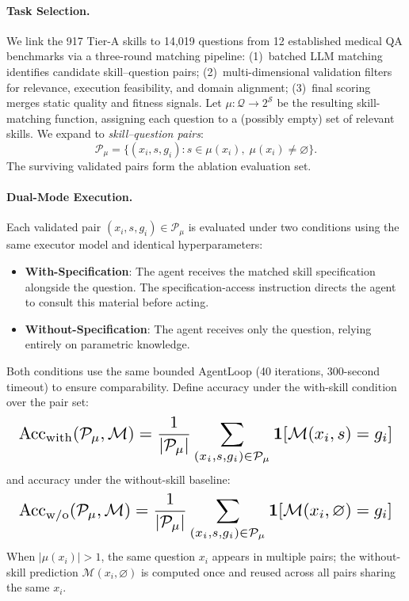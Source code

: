 \paragraph{Task Selection.}
We link the 917 Tier-A skills to 14,019 questions from 12 established medical QA benchmarks via a three-round matching pipeline:
(1)~batched LLM matching identifies candidate skill--question pairs;
(2)~multi-dimensional validation filters for relevance, execution feasibility, and domain alignment;
(3)~final scoring merges static quality and fitness signals.
Let $\mu: \mathcal{Q} \to 2^{\mathcal{S}}$ be the resulting skill-matching function, assigning each question to a (possibly empty) set of relevant skills.
We expand to \emph{skill--question pairs}:
\[
    \mathcal{P}_\mu = \{(x_i, s, g_i) : s \in \mu(x_i),\; \mu(x_i) \neq \varnothing\}.
\]
The surviving validated pairs form the ablation evaluation set.

\paragraph{Dual-Mode Execution.}
Each validated pair $(x_i, s, g_i) \in \mathcal{P}_\mu$ is evaluated under two conditions using the same executor model and identical hyperparameters:
\begin{itemize}[nosep,leftmargin=*]
  \item \textbf{With-Specification}: The agent receives the matched skill specification alongside the question. The specification-access instruction directs the agent to consult this material before acting.
  \item \textbf{Without-Specification}: The agent receives only the question, relying entirely on parametric knowledge.
\end{itemize}
Both conditions use the same bounded AgentLoop (40 iterations, 300-second timeout) to ensure comparability.
Define accuracy under the with-skill condition over the pair set:
\begin{equation}
    \resizebox{0.98\columnwidth}{!}{$\displaystyle
        \text{Acc}_{\text{with}}(\mathcal{P}_\mu, \mathcal{M})
        = \frac{1}{|\mathcal{P}_\mu|}
        \sum_{(x_i, s, g_i) \in \mathcal{P}_\mu}
        \mathbf{1}\!\left[\mathcal{M}(x_i, s) = g_i\right]
    $}
    \label{eq:acc_with}
\end{equation}
and accuracy under the without-skill baseline:
\begin{equation}
    \resizebox{0.98\columnwidth}{!}{$\displaystyle
        \text{Acc}_{\text{w/o}}(\mathcal{P}_\mu, \mathcal{M})
        = \frac{1}{|\mathcal{P}_\mu|}
        \sum_{(x_i, s, g_i) \in \mathcal{P}_\mu}
        \mathbf{1}\!\left[\mathcal{M}(x_i, \varnothing) = g_i\right]
    $}
    \label{eq:acc_wo}
\end{equation}
When $|\mu(x_i)| > 1$, the same question $x_i$ appears in multiple pairs; the without-skill prediction $\mathcal{M}(x_i, \varnothing)$ is computed once and reused across all pairs sharing the same $x_i$.

